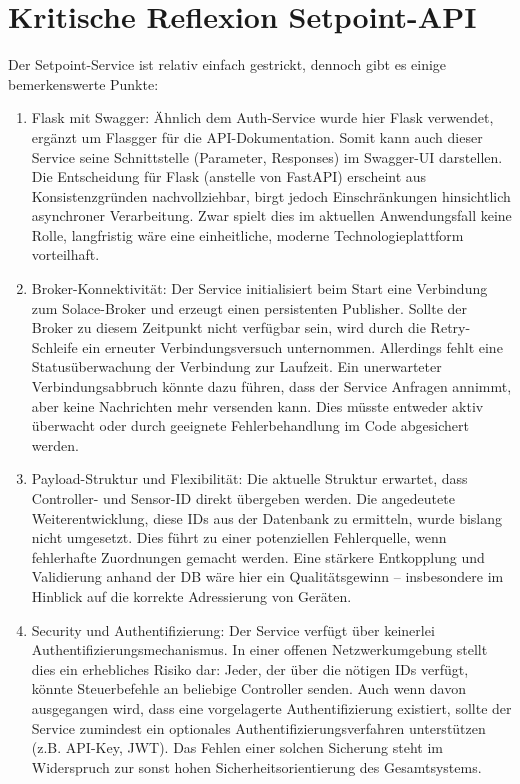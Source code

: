 \section{Kritische Reflexion Setpoint-API}
Der Setpoint-Service ist relativ einfach gestrickt, dennoch gibt es einige bemerkenswerte Punkte:
\begin{enumerate}
    \item Flask mit Swagger: Ähnlich dem Auth-Service wurde hier Flask verwendet, ergänzt um Flasgger für die API-Dokumentation. Somit kann auch dieser Service seine Schnittstelle (Parameter, Responses) im Swagger-UI darstellen. Die Entscheidung für Flask (anstelle von FastAPI) erscheint aus Konsistenzgründen nachvollziehbar, birgt jedoch Einschränkungen hinsichtlich asynchroner Verarbeitung. Zwar spielt dies im aktuellen Anwendungsfall keine Rolle, langfristig wäre eine einheitliche, moderne Technologieplattform vorteilhaft.
    \item Broker-Konnektivität: Der Service initialisiert beim Start eine Verbindung zum Solace-Broker und erzeugt einen persistenten Publisher. Sollte der Broker zu diesem Zeitpunkt nicht verfügbar sein, wird durch die Retry-Schleife ein erneuter Verbindungsversuch unternommen. Allerdings fehlt eine Statusüberwachung der Verbindung zur Laufzeit. Ein unerwarteter Verbindungsabbruch könnte dazu führen, dass der Service Anfragen annimmt, aber keine Nachrichten mehr versenden kann. Dies müsste entweder aktiv überwacht oder durch geeignete Fehlerbehandlung im Code abgesichert werden.
    \item Payload-Struktur und Flexibilität: Die aktuelle Struktur erwartet, dass Controller- und Sensor-ID direkt übergeben werden. Die angedeutete Weiterentwicklung, diese IDs aus der Datenbank zu ermitteln, wurde bislang nicht umgesetzt. Dies führt zu einer potenziellen Fehlerquelle, wenn fehlerhafte Zuordnungen gemacht werden. Eine stärkere Entkopplung und Validierung anhand der DB wäre hier ein Qualitätsgewinn – insbesondere im Hinblick auf die korrekte Adressierung von Geräten.
    \item Security und Authentifizierung: Der Service verfügt über keinerlei Authentifizierungsmechanismus. In einer offenen Netzwerkumgebung stellt dies ein erhebliches Risiko dar: Jeder, der über die nötigen IDs verfügt, könnte Steuerbefehle an beliebige Controller senden. Auch wenn davon ausgegangen wird, dass eine vorgelagerte Authentifizierung existiert, sollte der Service zumindest ein optionales Authentifizierungsverfahren unterstützen (z.B. API-Key, JWT). Das Fehlen einer solchen Sicherung steht im Widerspruch zur sonst hohen Sicherheitsorientierung des Gesamtsystems.

\end{enumerate}
